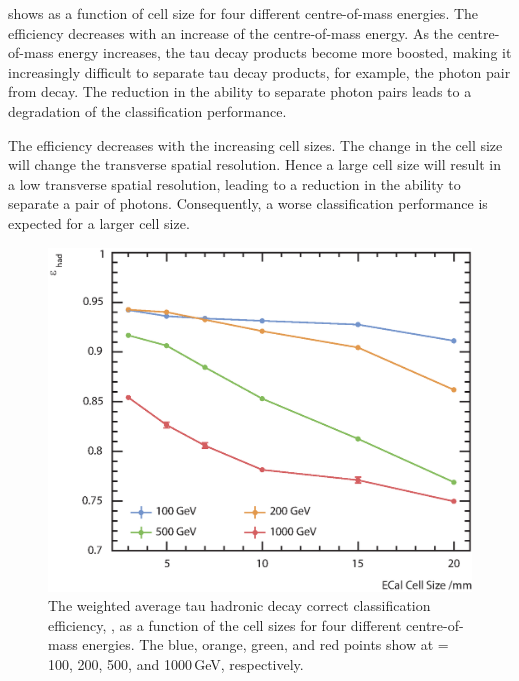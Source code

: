 
 shows \tauHad as a function of \ECAL cell size for four different centre-of-mass energies. The efficiency \tauHad decreases with an increase of the centre-of-mass energy. As the centre-of-mass energy increases, the tau decay products become more boosted, making it increasingly difficult to separate tau decay products, for example, the photon pair from \Ppizero decay. The reduction in the ability to separate photon pairs leads to a degradation of  the classification performance.

 The efficiency \tauHad decreases with the  increasing \ECAL cell sizes. The change in the \ECAL cell size will change the \ECAL transverse spatial resolution. Hence a large cell size will result in a low transverse spatial resolution, leading to a reduction in the ability to separate a pair of photons. Consequently, a worse classification performance is expected for a larger \ECAL cell size.


\begin{figure}[htbp]
\centering %
\includegraphics[width=.85\textwidth]{tau/plots3/hadronicEff2}
\caption[The tau hadronic decay efficiency as a function of  the \ECAL cell sizes at different \sqrtS with the \ILD detector model.]
{The weighted average tau hadronic decay correct classification efficiency, \tauHad, as a function of  the \ECAL cell sizes for four different centre-of-mass energies. The blue, orange, green, and red points  show \tauHad at \sqrtS = 100, 200, 500, and 1000\,GeV, respectively.}
\label{fig:TauHadronicEfficiency}
\end{figure}

